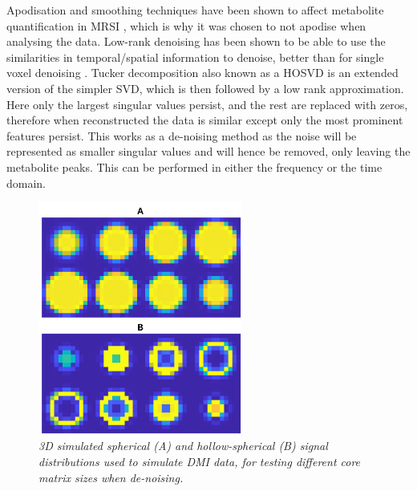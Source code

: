 Apodisation and smoothing techniques have been shown to affect metabolite quantification in \ac{MRSI} \cite{Goryawala2020EffectsFitting}, which is why it was chosen to not apodise when analysing the data. Low-rank denoising has been shown to be able to use the similarities in temporal/spatial information to denoise, better than for single voxel denoising \cite{Brender2019DynamicHyperpolarization, Goryawala2020EffectsFitting}. Tucker decomposition also known as a \ac{HOSVD} is an extended version of the simpler \ac{SVD}, which is then followed by a low rank approximation. Here only the largest singular values persist, and the rest are replaced with zeros, therefore when reconstructed the data is similar except only the most prominent features persist. This works as a de-noising method as the noise will be represented as smaller singular values and will hence be removed, only leaving the metabolite peaks. This can be performed in either the frequency or the time domain. 

\begin{figure}
    \centering
    \includegraphics[width = 0.6\textwidth]{Figures/Glucose/Template.png}
    \caption{\textit{3D simulated spherical (A) and hollow-spherical (B) signal distributions used to simulate \ac{DMI} data, for testing different core matrix sizes when de-noising.}}
    \label{fig:Glu:Temp}
\end{figure}

